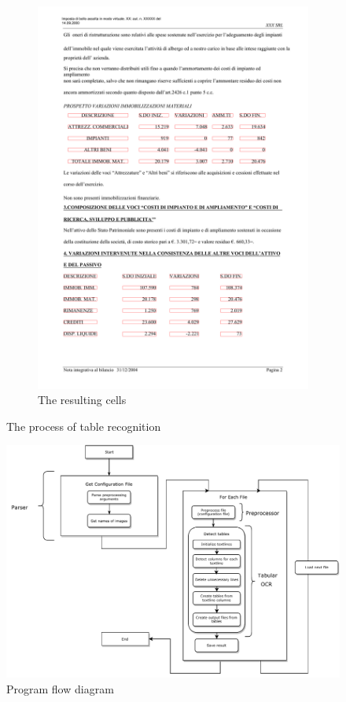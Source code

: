\begin{figure}[t]
\begin{subfigure}{0.45\textwidth}
\includegraphics[width=\linewidth]{img/implementation/implem4.png}
\caption{The resulting cells}
\label{fig:implem4}
\end{subfigure}
\caption{The process of table recognition}
\label{fig:implemTableRecogniton}
\end{figure}

\begin{figure}[t]
    \centering
	\includegraphics[width=1.0\linewidth]{img/implementation/programFlow.pdf}
	\caption{Program flow diagram}
	\label{fig:programFlow}
\end{figure}
